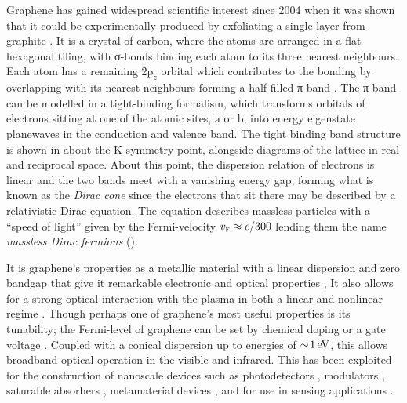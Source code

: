 Graphene has gained widespread scientific interest since 2004
\cite{Allen2010,Schwierz2010,Sanchez2012,Cooper2012,Pumera2013}
when it was shown that it could be experimentally produced by exfoliating a
single layer from graphite \cite{Novoselov2004}.
It is a \twod crystal of carbon, where the atoms are arranged in a flat
hexagonal tiling, with σ-bonds binding each atom to its three nearest
neighbours.
Each atom has a remaining $2\mathrm{p}_z$ orbital which contributes to the
bonding by overlapping with its nearest neighbours forming a half-filled π-band
\cite{CastroNeto2009}.
The π-band can be modelled in a tight-binding formalism, which transforms
orbitals of electrons sitting at one of the atomic sites, $\mathrm{a}$ or
$\mathrm{b}$, into energy eigenstate planewaves in the conduction and
valence band.
The tight binding band structure is shown in  about the $\mathrm{K}$
symmetry point, alongside diagrams of the lattice in real and reciprocal space.
About this point, the dispersion relation of electrons is linear and the two
bands meet with a vanishing energy gap, forming what is known as the
\emph{Dirac cone} since the electrons that sit there may be described
by a relativistic Dirac equation.
The equation describes massless particles with a “speed of light” given by
the Fermi-velocity $v_\textsc{f} \approx c / 300$ lending them the name
\emph{massless Dirac fermions} (\mdfs).

It is graphene's properties as a \twod metallic material with a linear dispersion
and zero bandgap that give it remarkable electronic and optical properties
\cite{Novoselov2005,Avouris2007,CastroNeto2009,Bonaccorso2010,DasSarma2011},
It also allows for a strong optical interaction with the \mdf plasma in both a
linear \cite{Falkovsky2007a,Kuzmenko2008,Nair2008,Mak2008}
and nonlinear regime
\cite{Mikhailov2007a,Hendry2010,Ishikawa2010,Nesterov2013}.
Though perhaps one of graphene's most useful properties is its tunability;
the Fermi-level of graphene can be set by chemical doping 
or a gate voltage \cite{Kim2010,Liu2011a,Ju2011,Fei2012}.
Coupled with a conical dispersion up to energies of $\sim\!1\operatorname{eV}$, this allows
broadband optical operation in the visible and infrared.
This has been exploited for the construction of nanoscale devices such as
photodetectors \cite{Mueller2010,Withers2013,Liu2014},
modulators \cite{Liu2011},
saturable absorbers \cite{Bao2009},
metamaterial devices \cite{Lee2012,Vakil2012,Hamm2013},
and for use in sensing applications \cite{Schedin2010,Lee2012a}.

